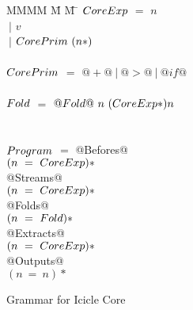 
\begin{figure}

\begin{tabbing}
MMMM \= M \= M \= \kill
$\mit{CoreExp}$
    \> $=$  \> $n$          \\
    \> $~|$ \> $v$ \\
    \> $~|$ \> $\mit{CorePrim}~(n*)$ \\
\\
$\mit{CorePrim}$
    \> $=$  \> $@+@~|~@>@~|~@if@$ \\
\\
$\mit{Fold}$
    \> $=$  \> $@Fold@~n~(\mit{CoreExp}*) n$ \\
\\
\\
$\mit{Program}$
    \> $=$  \> @Befores@ \\
    \>      \> \> $(n~=~\mit{CoreExp})*$ \\
    \>      \> @Streams@ \\
    \>      \> \> $(n~=~\mit{CoreExp})*$ \\
    \>      \> @Folds@ \\
    \>      \> \> $(n~=~\mit{Fold})*$ \\
    \>      \> @Extracts@ \\
    \>      \> \> $(n~=~\mit{CoreExp})*$ \\
    \>      \> @Outputs@ \\
    \>      \> \> $(n~=~n)*$ \\
\end{tabbing}


\caption{Grammar for Icicle Core}
\label{fig:core:grammar}
\end{figure}

